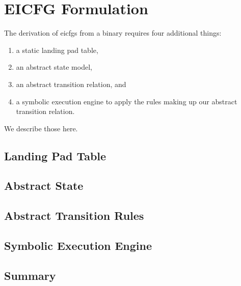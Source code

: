 \chapter{EICFG Formulation}\label{ch:eicfg-formulation}

The derivation of \acp{eicfg} from a binary requires four additional things:
\begin{enumerate}
    \item a static landing pad table,
    \item an abstract state model,
    \item an abstract transition relation, and
    \item a symbolic execution engine to apply the rules making up our abstract transition relation.
\end{enumerate}
We describe those here.

\section{Landing Pad Table}

\section{Abstract State}

\section{Abstract Transition Rules}

\section{Symbolic Execution Engine}

\section{Summary}
